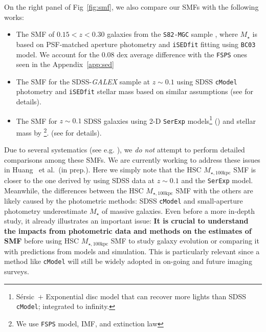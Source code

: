 \documentclass[fleqn,usenatbib]{mnras}
\def\etal{{\ et al.~}}
\def\ser{{S\'{e}rsic\ }}
\def\cmodel{\texttt{cModel}}
\def\mstar{{$M_{\star}$}}
\def\mtot{{$M_{\star,100\mathrm{kpc}}$}}
\begin{document}
    On the right panel of Fig~\ref{fig:smf}, we also compare our SMFs with the 
    following works:

    \begin{itemize}

        \item The SMF of $0.15 < z < 0.30$ galaxies from the \texttt{S82-MGC} sample
            \citep{Leauthaud2016}, where \mstar{} is based on PSF-matched aperture
            photometry and \texttt{iSEDfit} fitting using \texttt{BC03} model.
            We account for the 0.08 dex average difference with the \texttt{FSPS} 
            ones seen in the Appendix~\ref{app:sed}
       
        \item The SMF for the SDSS-\textit{GALEX} sample at $z{\sim} 0.1$ using 
            SDSS \cmodel{} photometry and \texttt{iSEDfit} stellar mass based on 
            similar assumptions (see \citet{Moustakas13} for details). 
            
        \item The SMF for $z{\sim} 0.1$ SDSS galaxies using 2-D \texttt{SerExp} 
            models\footnote{\ser{}$+$ Exponential disc model that can recover more 
            lights than SDSS \cmodel{}; integrated to infinity.}
            (\citealt{Bernardi2013, Meert2015}) and stellar mass by 
            \citet{Mendel2014}\footnote{We use \texttt{FSPS} model, 
            \citet{Chabrier2003} IMF, and \citet{Calzetti2000} extinction law}.
            (see \citet{Bernardi2017} for details).
            
    \end{itemize}
     
    Due to several systematics (see e.g. \citealt{Bernardi2013, Bernardi2017}), we 
    \emph{do not} attempt to perform detailed comparisons among these SMFs.
    We are currently working to address these issues in Huang \etal (in prep.). 
    Here we simply note that the HSC \mtot{} SMF is closer to the one 
    derived by \citet{Bernardi2017} using SDSS data at $z{\sim}0.1$ and the 
    \texttt{SerExp} model.
    Meanwhile, the differences between the HSC \mtot{} SMF with the others are 
    likely caused by the photometric methods: SDSS \cmodel{} and small-aperture 
    photometry underestimate \mstar{} of massive galaxies.  
    Even before a more in-depth study, it already illustrates an important issue:
    \textbf{It is crucial to understand the impacts from photometric data and 
    methods on the estimates of SMF} before using HSC \mtot{} SMF to study 
    galaxy evolution or 
    comparing it with predictions from models and simulation. 
    This is particularly relevant since a method like \cmodel{} will still be 
    widely adopted in on-going and future imaging surveys. 
    
\end{document}
